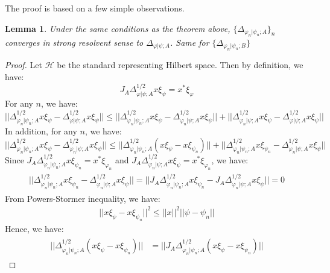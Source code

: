 \documentclass[a4paper,11pt]{article}
\newtheorem{lemma}[theorem]{Lemma}
\theoremstyle{definition}
\theoremstyle{remark}
\begin{document}
The proof is based on a few simple observations.
\begin{lemma}
    Under the same conditions as the theorem above, $\{\Delta_{\varphi_n|\psi_n;A}\}_n$ converges in strong resolvent sense to $\Delta_{\varphi|\psi;A}$. Same for $\{\Delta_{\varphi_n|\psi_n;B}\}$
\end{lemma}
\begin{proof}
    Let $\mathcal{H}$ be the standard representing Hilbert space. Then by definition, we have:
    \begin{equation}
        J_A\Delta^{1/2}_{\varphi|\psi;A}x\xi_{\psi} = x^*\xi_{\varphi}
    \end{equation}
    For any $n$, we have:
    \begin{equation}
        ||\Delta^{1/2}_{\varphi_n|\psi_n;A}x\xi_{\psi} - \Delta^{1/2}_{\varphi|\psi;A}x\xi_{\psi}|| \leq ||\Delta^{1/2}_{\varphi_n|\psi_n;A}x\xi_\psi - \Delta^{1/2}_{\varphi_n|\psi;A}x\xi_\psi|| + ||\Delta^{1/2}_{\varphi_n|\psi;A}x\xi_\psi - \Delta^{1/2}_{\varphi|\psi;A}x\xi_\psi|| 
    \end{equation}
    In addition, for any $n$, we have:
    \begin{equation}
        ||\Delta^{1/2}_{\varphi_n|\psi_n;A}x\xi_\psi - \Delta^{1/2}_{\varphi_n|\psi;A}x\xi_\psi|| \leq ||\Delta^{1/2}_{\varphi_n|\psi_n;A}(x\xi_\psi - x\xi_{\psi_n})|| + ||\Delta^{1/2}_{\varphi_n|\psi_n;A}x\xi_{\psi_n} - \Delta^{1/2}_{\varphi_n|\psi;A}x\xi_{\psi}||
    \end{equation}
    Since $J_A\Delta^{1/2}_{\varphi_n|\psi_n;A}x\xi_{\psi_n} = x^*\xi_{\varphi_n}$ and $J_A\Delta^{1/2}_{\varphi_n|\psi;A}x\xi_\psi = x^*\xi_{\varphi_n}$, we have:
    \begin{align}
        \begin{split}
            ||\Delta^{1/2}_{\varphi_n|\psi_n;A}x\xi_{\psi_n} - \Delta^{1/2}_{\varphi_n|\psi;A}x\xi_{\psi}|| = ||J_A\Delta^{1/2}_{\varphi_n|\psi_n;A}x\xi_{\psi_n} - J_A\Delta^{1/2}_{\varphi_n|\psi;A}x\xi_{\psi}|| = 0
        \end{split}
    \end{align}
    From Powers-Stormer inequality, we have:
    \begin{align}
        ||x\xi_\psi -x\xi_{\psi_n}||^2 \leq ||x||^2||\psi-\psi_n||
    \end{align}
    Hence, we have:
    \begin{align}
        \begin{split}
            ||\Delta^{1/2}_{\varphi_n|\psi_n;A}(x\xi_\psi -x\xi_{\psi_n})|| &= ||J_A\Delta^{1/2}_{\varphi_n|\psi_n;A}(x\xi_\psi - x\xi_{\psi_n})||

\end{split}
\end{align}
\end{proof}
\end{document}
